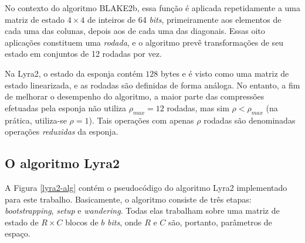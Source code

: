 \documentclass{article}
\begin{document}
No contexto do algoritmo BLAKE2b, essa função é aplicada repetidamente a
uma matriz de estado $4 \times 4$ de inteiros de 64 \emph{bits},
primeiramente aos elementos de cada uma das colunas, depois aos de cada
uma das diagonais. Essas oito aplicações constituem uma \emph{rodada}, e
o algoritmo prevê transformações de seu estado em conjuntos de 12
rodadas por vez.

Na Lyra2, o estado da esponja contém $128$ bytes e é visto como uma
matriz de estado linearizada, e as rodadas são definidas de forma
análoga. No entanto, a fim de melhorar o desempenho do algoritmo, a
maior parte das compressões efetuadas pela esponja não utiliza
$\rho_{max} = 12$ rodadas, mas sim $\rho < \rho_{max}$ (na prática,
utiliza-se $\rho = 1$). Tais operações com apenas $\rho$ rodadas são
denominadas operações \emph{reduzidas} da esponja.

\subsection{O algoritmo Lyra2 }\label{sec-lyra2-alg}

A Figura \ref{lyra2-alg} contém o pseudocódigo do algoritmo Lyra2
implementado para este trabalho. Basicamente, o algoritmo consiste de três etapas: \emph{bootstrapping},
\emph{setup} e \emph{wandering}. Todas elas trabalham sobre uma matriz
de estado de $R \times C$ blocos de $b$ \emph{bits}, onde $R$ e $C$
são, portanto, parâmetros de espaço.
\end{document}

